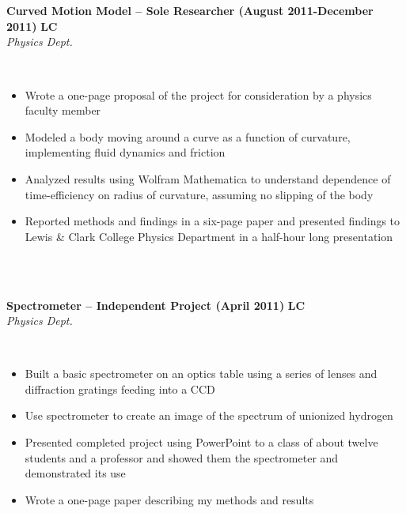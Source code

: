 \documentclass{article}
\begin{document}
\phantom \\
\phantom \\
%
%
%
%
\begin{vwcol}[widths={0.8,0.2}, sep=.8cm, justify=flush, rule=0pt, indent=0em]
\noindent \textbf{Curved Motion Model – Sole Researcher (August 2011-December 2011)}
\newpage
\noindent \textbf{LC}\\
\noindent \emph{Physics Dept.}
\end{vwcol}
\phantom \\
\begin{itemize}
\item Wrote a one-page proposal of the project for consideration by a physics faculty member
\item Modeled a body moving around a curve as a function of curvature, implementing fluid dynamics and friction
\item Analyzed results using Wolfram Mathematica to understand dependence of time-efficiency on radius of curvature, assuming no slipping of the body
\item Reported methods and findings in a six-page paper and presented findings to Lewis \& Clark College Physics Department in a half-hour long presentation
\end{itemize}
\phantom \\
\phantom \\
%
%
%
%
\begin{vwcol}[widths={0.8,0.2}, sep=.8cm, justify=flush, rule=0pt, indent=0em]
\noindent \textbf{Spectrometer – Independent Project (April 2011)}
\newpage
\noindent \textbf{LC}\\
\noindent \emph{Physics Dept.}
\end{vwcol}
\phantom \\
\begin{itemize}
\item Built a basic spectrometer on an optics table using a series of lenses and diffraction gratings feeding into a CCD
\item Use spectrometer to create an image of the spectrum of unionized hydrogen
\item Presented completed project using PowerPoint to a class of about twelve students and a professor and showed them the spectrometer and demonstrated its use
\item Wrote a one-page paper describing my methods and results
\end{itemize}
\phantom \\
\phantom \\
\end{document}
